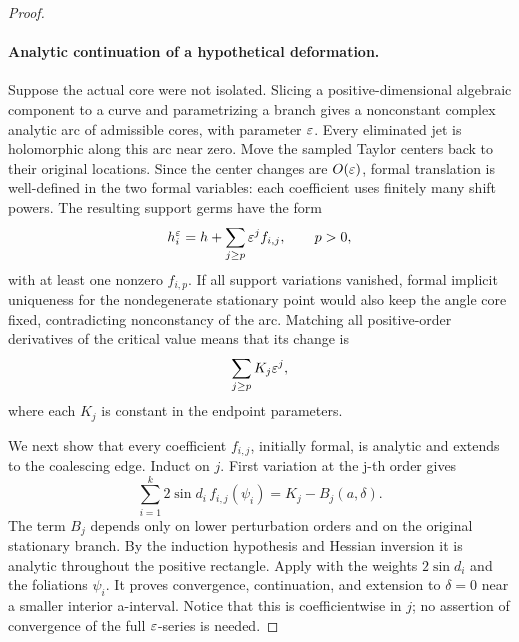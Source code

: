 \begin{proof}
\paragraph{Analytic continuation of a hypothetical deformation.}
Suppose the actual core were not isolated.  Slicing a
positive-dimensional algebraic component to a curve and
parametrizing a branch gives a nonconstant complex analytic
arc of admissible cores, with parameter \(\varepsilon\).
Every eliminated jet is holomorphic along this arc near
zero.  Move the sampled Taylor centers back to their
original locations.  Since the center changes are
\(O(\varepsilon)\), formal translation is well-defined in the two
formal variables: each coefficient uses finitely many
shift powers.  The resulting support germs have the form
\begin{equation}
 h_i^\varepsilon=h+\sum_{j\ge p}\varepsilon^j f_{i,j},
 \qquad p>0,
 \label{cont:line-formal-deformation}
\end{equation}
with at least one nonzero \(f_{i,p}\).  If all support
variations vanished, formal implicit uniqueness for the
nondegenerate stationary point would also keep the angle
core fixed, contradicting nonconstancy of the arc.
Matching all positive-order derivatives of the critical
value means that its change is
\[
 \sum_{j\ge p}K_j\varepsilon^j,
 \]
where each \(K_j\) is constant in the endpoint parameters.

We next show that every coefficient \(f_{i,j}\), initially
formal, is analytic and extends to the coalescing edge.
Induct on \(j\).  First variation at the j-th order gives
\begin{equation}
 \sum_{i=1}^k2\sin d_i\,f_{i,j}(\psi_i)
       =K_j-B_j(a,\delta).
 \label{cont:line-variation-web}
\end{equation}
The term \(B_j\) depends only on lower perturbation orders
and on the original stationary branch.  By the induction
hypothesis and Hessian inversion it is analytic throughout
the positive rectangle.  Apply
 with the weights \(2\sin d_i\)
and the foliations \(\psi_i\).  It proves convergence,
continuation, and extension to \(\delta=0\) near a smaller
interior a-interval.  Notice that this is coefficientwise
in \(j\); no assertion of convergence of the full
\(\varepsilon\)-series is needed.


\end{proof}
